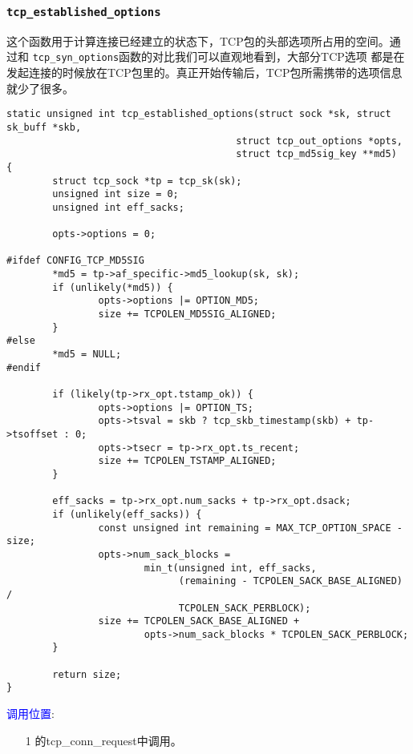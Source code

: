         \subsubsection{\texttt{tcp_established_options}}
            这个函数用于计算连接已经建立的状态下，TCP包的头部选项所占用的空间。通过和
            \texttt{tcp_syn_options}函数的对比我们可以直观地看到，大部分TCP选项
            都是在发起连接的时候放在TCP包里的。真正开始传输后，TCP包所需携带的选项信息
            就少了很多。
\begin{verbatim}
static unsigned int tcp_established_options(struct sock *sk, struct sk_buff *skb,
                                        struct tcp_out_options *opts,
                                        struct tcp_md5sig_key **md5)
{       
        struct tcp_sock *tp = tcp_sk(sk);
        unsigned int size = 0;
        unsigned int eff_sacks;
        
        opts->options = 0;

#ifdef CONFIG_TCP_MD5SIG
        *md5 = tp->af_specific->md5_lookup(sk, sk);
        if (unlikely(*md5)) { 
                opts->options |= OPTION_MD5;
                size += TCPOLEN_MD5SIG_ALIGNED;
        }
#else   
        *md5 = NULL;
#endif
        
        if (likely(tp->rx_opt.tstamp_ok)) {
                opts->options |= OPTION_TS;
                opts->tsval = skb ? tcp_skb_timestamp(skb) + tp->tsoffset : 0;
                opts->tsecr = tp->rx_opt.ts_recent;
                size += TCPOLEN_TSTAMP_ALIGNED;
        }
        
        eff_sacks = tp->rx_opt.num_sacks + tp->rx_opt.dsack;
        if (unlikely(eff_sacks)) { 
                const unsigned int remaining = MAX_TCP_OPTION_SPACE - size;
                opts->num_sack_blocks =
                        min_t(unsigned int, eff_sacks,
                              (remaining - TCPOLEN_SACK_BASE_ALIGNED) /
                              TCPOLEN_SACK_PERBLOCK);
                size += TCPOLEN_SACK_BASE_ALIGNED +
                        opts->num_sack_blocks * TCPOLEN_SACK_PERBLOCK;
        }
        
        return size;
}
\end{verbatim}

        \textcolor{blue}{调用位置}:
            \begin{enumerate}
                \item[1]        \label{Server:tcp_conn_request}的tcp\_conn\_request中调用。
            \end{enumerate}

